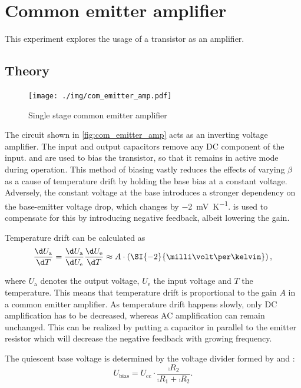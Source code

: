\chapter{Common emitter amplifier}
This experiment explores the usage of a transistor as an amplifier.

\section{Theory}\label{sec:theory}
\begin{figure}[tbp]
	\centering
	\texttt{[image: ./img/com\_emitter\_amp.pdf]}
	\caption[Single Stage Common Emitter Amplifier]{Single stage common emitter amplifier}
	\label{fig:com_emitter_amp}
\end{figure}
The circuit shown in \autoref{fig:com_emitter_amp} acts as an inverting voltage amplifier.
The input and output capacitors remove any DC component of the input.
 and  are used to bias the transistor, so that it remains in active mode during operation.
This method of biasing vastly reduces the effects of varying $\beta$ as a cause of temperature drift by holding the base bias at a constant voltage.
Adversely, the constant voltage at the base introduces a stronger dependency on the base-emitter voltage drop, which changes by \SI{-2}{\milli\volt\per\kelvin}.
 is used to compensate for this by introducing negative feedback, albeit lowering the gain.

Temperature drift can be calculated as
\begin{equation}
	\frac{\d U_\text{a}}{\d T}=\frac{\d U_\text{a}}{\d U_\text{e}}\frac{\d U_\text{e}}{\d T}\approx A\cdot \left( \SI{-2}{\milli\volt\per\kelvin} \right),
\end{equation}

where $U_\text{a}$ denotes the output voltage, $U_\text{e}$ the input voltage and $T$ the temperature.
This means that temperature drift is proportional to the gain $A$ in a common emitter amplifier.
As temperature drift happens slowly, only DC amplification has to be decreased, whereas AC amplification can remain unchanged.
This can be realized by putting a capacitor  in parallel to the emitter resistor  which will decrease the negative feedback with growing frequency.

The quiescent base voltage is determined by the voltage divider formed by  and :
\begin{equation}\label{eq:bias_volt}
	U_\text{bias}=U_\text{cc}\cdot\frac{\comp{R_2}}{\comp{R_1}+\comp{R_2}}.
\end{equation}

